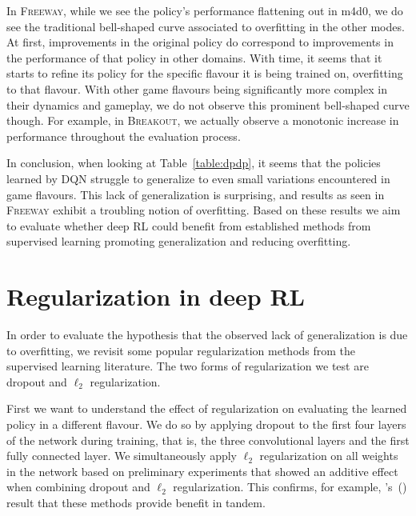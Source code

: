 \documentclass{article}
\newcommand\cites[1]{\citeauthor{#1}'s\ (\citeyear{#1})}
\begin{document}
In \textsc{Freeway}, while we see the policy's performance flattening out in m4d0, we do see the traditional bell-shaped curve associated to overfitting in the other modes. At first, improvements in the original policy do correspond to improvements in the performance of that policy in other domains. With time, it seems that it starts to refine its policy for the specific flavour it is being trained on, overfitting to that flavour. With other game flavours being significantly more complex in their dynamics and gameplay, we do not observe this prominent bell-shaped curve though. For example, in \textsc{Breakout}, we actually observe a monotonic increase in performance throughout the evaluation process.

In conclusion, when looking at Table~\ref{table:dpdp}, it seems that the policies learned by DQN struggle to generalize to even small variations encountered in game flavours. This lack of generalization is surprising, and results as seen in \textsc{Freeway} exhibit a troubling notion of overfitting. Based on these results we aim to evaluate whether deep RL could benefit from established methods from supervised learning promoting generalization and reducing overfitting.


\section{Regularization in deep RL}

In order to evaluate the hypothesis that the observed lack of generalization is due to overfitting, we revisit some popular regularization methods from the supervised learning literature. The two forms of regularization we test are dropout and $\ell_2$ regularization.

First we want to understand the effect of regularization on evaluating the learned policy in a different flavour. We do so by applying dropout to the first four layers of the network during training, that is, the three convolutional layers and the first fully connected layer. We simultaneously apply $\ell_2$ regularization on all weights in the network based on preliminary experiments that showed an additive effect when combining dropout and $\ell_2$ regularization.
This confirms, for example, \cites{Srivastava14} result that these methods provide benefit in tandem.
\end{document}
